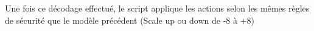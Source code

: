 
%        

Une fois ce décodage effectué, le script applique les actions selon les mêmes règles de sécurité que le modèle précédent (Scale up ou down de -8 à +8)

%    
%

